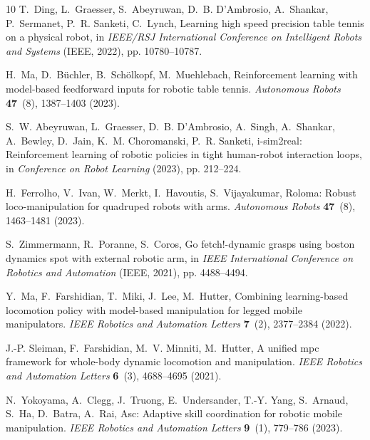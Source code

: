 \documentclass[9pt,twocolumn,twoside]{osajnl}
\begin{document}
\begin{thebibliography}{10}
    T.~{Ding}, L.~{Graesser}, S.~{Abeyruwan}, D.~B. {D'Ambrosio}, A.~{Shankar},
      P.~{Sermanet}, P.~R. {Sanketi}, C.~{Lynch}, Learning high speed precision
      table tennis on a physical robot, in \emph{IEEE/RSJ International Conference
      on Intelligent Robots and Systems} (IEEE, 2022), pp. 10780--10787.
    
    H.~{Ma}, D.~{B{\"u}chler}, B.~{Sch{\"o}lkopf}, M.~{Muehlebach}, Reinforcement
      learning with model-based feedforward inputs for robotic table tennis.
      \emph{Autonomous Robots} \textbf{47}~(8), 1387--1403 (2023).
    
    S.~W. {Abeyruwan}, L.~{Graesser}, D.~B. {D'Ambrosio}, A.~{Singh}, A.~{Shankar},
      A.~{Bewley}, D.~{Jain}, K.~M. {Choromanski}, P.~R. {Sanketi}, i-sim2real:
      Reinforcement learning of robotic policies in tight human-robot interaction
      loops, in \emph{Conference on Robot Learning} (2023), pp. 212--224.
    
    H.~{Ferrolho}, V.~{Ivan}, W.~{Merkt}, I.~{Havoutis}, S.~{Vijayakumar}, Roloma:
      Robust loco-manipulation for quadruped robots with arms. \emph{Autonomous
      Robots} \textbf{47}~(8), 1463--1481 (2023).
    
    S.~{Zimmermann}, R.~{Poranne}, S.~{Coros}, Go fetch!-dynamic grasps using
      boston dynamics spot with external robotic arm, in \emph{IEEE International
      Conference on Robotics and Automation} (IEEE, 2021), pp. 4488--4494.
    
    Y.~{Ma}, F.~{Farshidian}, T.~{Miki}, J.~{Lee}, M.~{Hutter}, Combining
      learning-based locomotion policy with model-based manipulation for legged
      mobile manipulators. \emph{IEEE Robotics and Automation Letters}
      \textbf{7}~(2), 2377--2384 (2022).
    
    J.-P. {Sleiman}, F.~{Farshidian}, M.~V. {Minniti}, M.~{Hutter}, A unified mpc
      framework for whole-body dynamic locomotion and manipulation. \emph{IEEE
      Robotics and Automation Letters} \textbf{6}~(3), 4688--4695 (2021).
    
    N.~{Yokoyama}, A.~{Clegg}, J.~{Truong}, E.~{Undersander}, T.-Y. {Yang},
      S.~{Arnaud}, S.~{Ha}, D.~{Batra}, A.~{Rai}, Asc: Adaptive skill coordination
      for robotic mobile manipulation. \emph{IEEE Robotics and Automation Letters}
      \textbf{9}~(1), 779--786 (2023).
    

\end{thebibliography}
\end{document}
